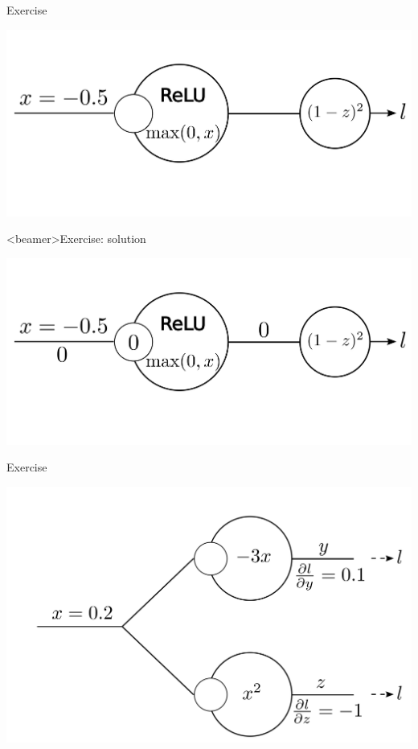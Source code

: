 \documentclass[xcolor=pdftex,dvipsnames,table,mathserif]{beamer}
\begin{document}
\begin{frame}{Exercise}

\includegraphics[width=\textwidth]{bp_relu_exo2.png}

\end{frame}

\begin{frame}<beamer>{Exercise: solution}

\includegraphics[width=\textwidth]{bp_relu_exo2_sol.png}

\end{frame}


\begin{frame}{Exercise}

\includegraphics[width=\textwidth]{bp_split.png}

\end{frame}
\end{document}
